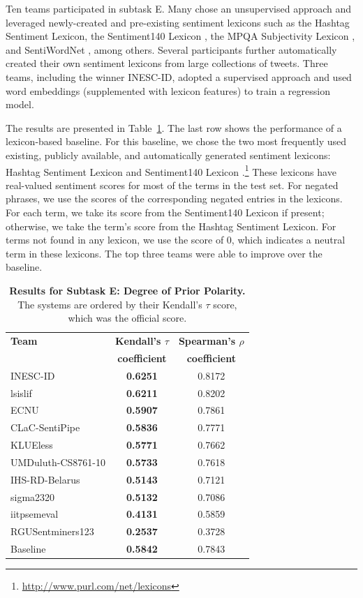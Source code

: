 \documentclass[11pt]{article}
\begin{document}
Ten teams participated in subtask E. 
Many chose an unsupervised approach and leveraged newly-created and pre-existing sentiment lexicons
such as 
the Hashtag Sentiment Lexicon,
the Sentiment140 Lexicon \cite{NRCJAIR14},
the MPQA Subjectivity Lexicon \cite{Wilson05},
and SentiWordNet \cite{swn}, among others. 
Several participants further automatically created their own sentiment lexicons from large collections of tweets.
Three teams, including the winner INESC-ID, adopted a supervised approach and used word embeddings (supplemented with lexicon features) to train a regression model.

The results are presented in Table~\ref{tab:res-subtaskE}.
The last row shows the performance of a lexicon-based baseline. 
For this baseline, we chose the two most frequently used existing, publicly available, and automatically generated sentiment lexicons: Hashtag Sentiment Lexicon and Sentiment140 Lexicon \cite{NRCJAIR14}.\footnote{\url{http://www.purl.com/net/lexicons}}
These lexicons have real-valued sentiment scores for most of the terms in the test set.
For negated phrases, we use the scores of the corresponding negated entries in the lexicons.
For each term, we take its score from the Sentiment140 Lexicon if present; otherwise, we take the term's score from the Hashtag Sentiment Lexicon.
For terms not found in any lexicon, we use the score of 0, which indicates a neutral term in these lexicons.
The top three teams were able to improve over the baseline.

\setlength{\tabcolsep}{4pt}

\begin{table}[t!]
\begin{center}
\small{
\begin{tabular}{lcc}
\hline {\bf Team}	& {\bf Kendall's $\tau$} & {\bf	Spearman's $\rho$}\\ 
& {\bf coefficient} & {\bf	coefficient}\\ \hline
INESC-ID &	\textbf{0.6251}	& 0.8172\\
lsislif	& \textbf{0.6211}	& 0.8202\\
ECNU	& \textbf{0.5907}	& 0.7861\\
CLaC-SentiPipe	& \textbf{0.5836}	& 0.7771\\
KLUEless	& \textbf{0.5771}	& 0.7662\\
UMDuluth-CS8761-10	& \textbf{0.5733}	& 0.7618\\
IHS-RD-Belarus	& \textbf{0.5143}	& 0.7121\\
sigma2320	& \textbf{0.5132}	& 0.7086\\
iitpsemeval	& \textbf{0.4131}	& 0.5859\\
RGUSentminers123	& \textbf{0.2537}	& 0.3728\\[4pt] \hline
Baseline & \textbf{0.5842} & 0.7843 \\
\hline
\end{tabular}
}
\caption{\textbf{Results for Subtask E: Degree of Prior Polarity.} The systems are ordered by their Kendall's $\tau$ score, which was the official score.}
\label{tab:res-subtaskE}
\end{center}
\vspace*{-5mm}
\end{table}
\end{document}
